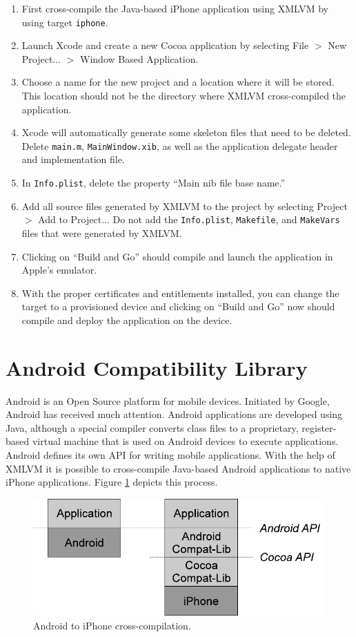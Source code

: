\documentclass[11pt]{book}
\begin{document}
\begin{enumerate}
\item First cross-compile the Java-based iPhone application using
  XMLVM by using target \texttt{iphone}.
\item Launch Xcode and create a new Cocoa application by selecting
  File $>$ New Project... $>$ Window Based Application.
\item Choose a name for the new project and a location where it will
  be stored. This location should not be the directory where XMLVM
  cross-compiled the application.
\item Xcode will automatically generate some skeleton files that need
  to be deleted. Delete \texttt{main.m}, \texttt{MainWindow.xib}, as
  well as the application delegate header and implementation file.
\item In \texttt{Info.plist}, delete the property ``Main nib file base
  name.''
\item Add all source files generated by XMLVM to the project by
  selecting Project $>$ Add to Project... Do not add the
  \texttt{Info.plist}, \texttt{Makefile}, and \texttt{MakeVars} files
  that were generated by XMLVM.
\item Clicking on ``Build and Go'' should compile and launch the
  application in Apple's emulator.
\item With the proper certificates and entitlements installed, you can
  change the target to a provisioned device and clicking on ``Build
  and Go'' now should compile and deploy the application on the
  device.
\end{enumerate}


\section{Android Compatibility Library}
\label{SEC_ANDROID4IPHONE}

Android is an Open Source platform for mobile devices. Initiated by
Google, Android has received much attention. Android applications are
developed using Java, although a special compiler converts class files
to a proprietary, register-based virtual machine that is used on
Android devices to execute applications. Android defines its own API
for writing mobile applications. With the help of XMLVM it is possible
to cross-compile Java-based Android applications to native iPhone
applications. Figure \ref{FIG_ANDROID2IPHONE} depicts this process.

\begin{figure}
\includegraphics{pics/android2iphone.pdf}
\caption{\label{FIG_ANDROID2IPHONE} Android to iPhone cross-compilation.}
\end{figure}
\end{document}
